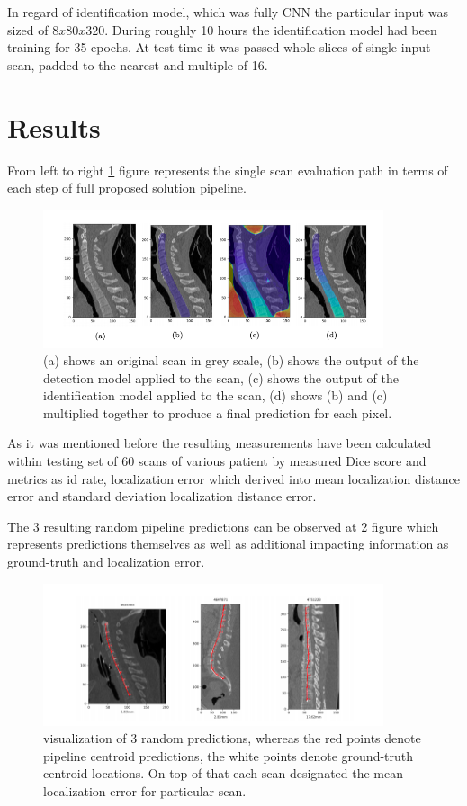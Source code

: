In regard of identification model, which was fully CNN the particular input was sized of $8x80x320$. During roughly 10 hours the identification model had been training for 35 epochs. At test time it was passed whole slices of single input scan, padded to the nearest and multiple of 16.


\section{Results}
From left to right \ref{fig:step_step_predictions} figure represents the single scan evaluation path in terms of each step of full proposed solution pipeline. 

\begin{figure}[h]
    \centering \includegraphics[width=10cm]{images/step_step_predictions.png}
    \caption {(a) shows an original scan in grey scale, (b) shows the output of the detection model applied to the scan, (c) shows the output of the identification model
    applied to the scan, (d) shows (b) and (c) multiplied together to produce a final prediction for each pixel.}
    \label{fig:step_step_predictions}
\end{figure}

As it was mentioned before the resulting measurements have been calculated within testing set of 60 scans of various patient by measured Dice score and metrics as id rate, localization error which derived into mean localization distance error and standard deviation localization distance error.

The 3 resulting random pipeline predictions can be observed at \ref{fig:predictions} figure which represents predictions themselves as well as additional impacting information as ground-truth and localization error. 
\begin{figure}[h]
    \centering \includegraphics[width=10cm]{images/predictions.png}
    \caption {visualization of 3 random predictions, whereas the red points denote pipeline centroid predictions, the white points denote ground-truth centroid locations. On top of that each scan designated the mean localization error for particular scan.}
    \label{fig:predictions}
\end{figure}

